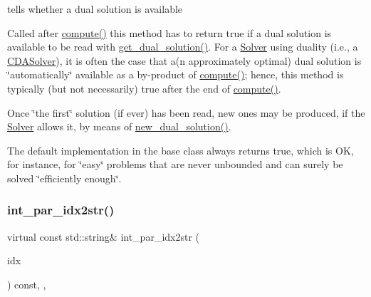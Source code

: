 tells whether a dual solution is available 

Called after \mbox{\hyperlink{class_s_m_spp__di__unipi__it_1_1_solver_a504d4e3e174c7a518cc66156a8a45ce5}{compute()}} this method has to return true if a dual solution is available to be read with \mbox{\hyperlink{class_s_m_spp__di__unipi__it_1_1_c_d_a_solver_a347d37171494bf83416a48b279b94d5a}{get\+\_\+dual\+\_\+solution()}}. For a \mbox{\hyperlink{class_s_m_spp__di__unipi__it_1_1_solver}{Solver}} using duality (i.\+e., a \mbox{\hyperlink{class_s_m_spp__di__unipi__it_1_1_c_d_a_solver}{C\+D\+A\+Solver}}), it is often the case that a(n approximately optimal) dual solution is \char`\"{}automatically\char`\"{} available as a by-\/product of \mbox{\hyperlink{class_s_m_spp__di__unipi__it_1_1_solver_a504d4e3e174c7a518cc66156a8a45ce5}{compute()}}; hence, this method is typically (but not necessarily) true after the end of \mbox{\hyperlink{class_s_m_spp__di__unipi__it_1_1_solver_a504d4e3e174c7a518cc66156a8a45ce5}{compute()}}.

Once \char`\"{}the first\char`\"{} solution (if ever) has been read, new ones may be produced, if the \mbox{\hyperlink{class_s_m_spp__di__unipi__it_1_1_solver}{Solver}} allows it, by means of \mbox{\hyperlink{class_s_m_spp__di__unipi__it_1_1_c_d_a_solver_a8c650415b6673c33692c363abdfdef00}{new\+\_\+dual\+\_\+solution()}}.

The default implementation in the base class always returns true, which is OK, for instance, for \char`\"{}easy\char`\"{} problems that are never unbounded and can surely be solved \char`\"{}efficiently enough\char`\"{}. \mbox{\label{class_s_m_spp__di__unipi__it_1_1_c_d_a_solver_a61e973f39747f63b8f56d97cc62e32ce}} 
\subsubsection{\texorpdfstring{int\+\_\+par\+\_\+idx2str()}{int\_par\_idx2str()}}
{\footnotesize\ttfamily virtual const std\+::string\& int\+\_\+par\+\_\+idx2str (\begin{DoxyParamCaption}\item[{const \mbox{\hyperlink{class_s_m_spp__di__unipi__it_1_1_thin_compute_interface_aa3d710629ad8c434286726ad810c3b47}{idx\+\_\+type}}}]{idx }\end{DoxyParamCaption}) const\hspace{0.3cm}{\ttfamily [inline]}, {\ttfamily [override]}, {\ttfamily [virtual]}}



